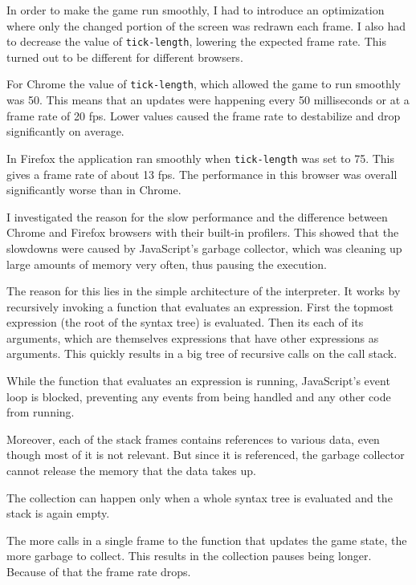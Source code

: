 In order to make the game run smoothly, I had to introduce an optimization where only the changed portion of the screen was redrawn each frame. I also had to decrease the value of \texttt{tick-length}, lowering the expected frame rate. This turned out to be different for different browsers.

For Chrome the value of \texttt{tick-length}, which allowed the game to run smoothly was 50. This means that an updates were happening every 50 milliseconds or at a frame rate of 20 \acrshort{fps}. Lower values caused the frame rate to destabilize and drop significantly on average.

In Firefox the application ran smoothly when \texttt{tick-length} was set to 75. This gives a frame rate of about 13 \acrshort{fps}. The performance in this browser was overall significantly worse than in Chrome.

I investigated the reason for the slow performance and the difference between Chrome and Firefox browsers with their built-in profilers. This showed that the slowdowns were caused by JavaScript's garbage collector, which was cleaning up large amounts of memory very often, thus pausing the execution.

The reason for this lies in the simple architecture of the interpreter. It works by recursively invoking a function that evaluates an expression. First the topmost expression (the root of the syntax tree) is evaluated. Then its each of its arguments, which are themselves expressions that have other expressions as arguments. This quickly results in a big tree of recursive calls on the call stack.

While the function that evaluates an expression is running, JavaScript's event loop is blocked, preventing any events from being handled and any other code from running.

Moreover, each of the stack frames contains references to various data, even though most of it is not relevant. But since it is referenced, the garbage collector cannot release the memory that the data takes up.

The collection can happen only when a whole syntax tree is evaluated and the stack is again empty. 


The more calls in a single frame to the function that updates the game state, the more garbage to collect. This results in the collection pauses being longer. Because of that the frame rate drops.

